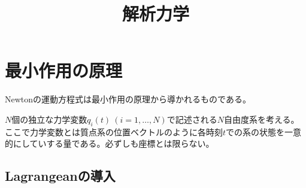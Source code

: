 \documentclass[dvipdfmx, leqno]{jsbook}
\title{解析力学}
\begin{document}
\maketitle
\tableofcontents

\section{最小作用の原理}
    Newtonの運動方程式は最小作用の原理から導かれるものである。

    $N$個の独立な力学変数$q_i(t)\ (i= 1, \ldots, N)$で記述される$N$自由度系を考える。ここで力学変数とは質点系の位置ベクトルのように各時刻$t$での系の状態を一意的にしていする量である。必ずしも座標とは限らない。

\subsection{Lagrangeanの導入}
\end{document}
